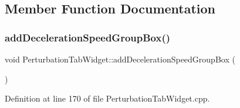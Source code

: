 \subsection{Member Function Documentation}
\mbox{\label{class_perturbation_tab_widget_ad9a685f191ca94bdc47f148273fdf1f4}} 
\subsubsection{\texorpdfstring{add\+Deceleration\+Speed\+Group\+Box()}{addDecelerationSpeedGroupBox()}}
{\footnotesize\ttfamily void Perturbation\+Tab\+Widget\+::add\+Deceleration\+Speed\+Group\+Box (\begin{DoxyParamCaption}{ }\end{DoxyParamCaption})}



Definition at line 170 of file Perturbation\+Tab\+Widget.\+cpp.

